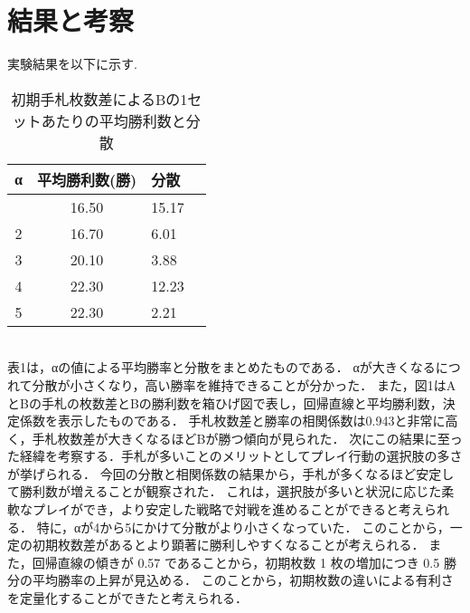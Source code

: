 \documentclass[twocolumn]{ltjsarticle}
\begin{document}
\section{結果と考察}
\small{
  実験結果を以下に示す.
}
\begin{table}[h]
  \centering
  \caption{初期手札枚数差によるBの1セットあたりの平均勝利数と分散}
  \begin{tabular}{clll}
    α &平均勝利数(勝)& 分散\\
    \hline \hline
    \centering
    1&\multicolumn{1}{c}{16.50}&\multicolumn{1}{l}{15.17}\\
    2&\multicolumn{1}{c}{16.70}&\multicolumn{1}{l}{6.01}\\
    3&\multicolumn{1}{c}{20.10}&\multicolumn{1}{l}{3.88}\\
    4&\multicolumn{1}{c}{22.30}&\multicolumn{1}{l}{12.23}\\
    5&\multicolumn{1}{c}{22.30}&\multicolumn{1}{l}{2.21}\\
    \hline%
  \end{tabular}
\end{table}

\small{\leavevmode\\
表1は，αの値による平均勝率と分散をまとめたものである．
αが大きくなるにつれて分散が小さくなり，高い勝率を維持できることが分かった．
また，図1はAとBの手札の枚数差とBの勝利数を箱ひげ図で表し，回帰直線と平均勝利数，決定係数を表示したものである．
手札枚数差と勝率の相関係数は0.943と非常に高く，手札枚数差が大きくなるほどBが勝つ傾向が見られた．
次にこの結果に至った経緯を考察する．手札が多いことのメリットとしてプレイ行動の選択肢の多さが挙げられる．
今回の分散と相関係数の結果から，手札が多くなるほど安定して勝利数が増えることが観察された．
これは，選択肢が多いと状況に応じた柔軟なプレイができ，より安定した戦略で対戦を進めることができると考えられる．
特に，αが4から5にかけて分散がより小さくなっていた．
このことから，一定の初期枚数差があるとより顕著に勝利しやすくなることが考えられる．
また，回帰直線の傾きが 0.57 であることから，初期枚数 1 枚の増加につき 0.5 勝分の平均勝率の上昇が見込める．
このことから，初期枚数の違いによる有利さを定量化することができたと考えられる．
}
\end{document}
